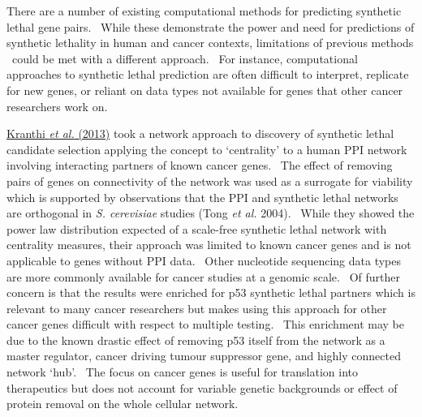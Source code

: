 There are a number of existing computational methods for predicting synthetic lethal gene pairs. \ While these demonstrate the power and need for predictions of synthetic lethality in human and cancer contexts, limitations of previous methods \ could be met with a different approach. \ For instance, computational approaches to synthetic lethal prediction are often difficult to interpret, replicate for new genes, or reliant on data types not available for genes that other cancer researchers work on. \  

\hyperlink{ENREF59}{Kranthi}\hyperlink{ENREF59}{\textit{ et al.}}\hyperlink{ENREF59}{ (2013)} took a network approach to discovery of synthetic lethal candidate selection applying the concept to {\textquoteleft}centrality{\textquoteright} to a human PPI network involving interacting partners of known cancer genes. \ The effect of removing pairs of genes on connectivity of the network was used as a surrogate for viability which is supported by observations that the PPI and synthetic lethal networks are orthogonal in \textit{S. cerevisiae} studies (Tong\textit{ et al.} 2004). \ While they showed the power law distribution expected of a scale-free synthetic lethal network with centrality measures, their approach was limited to known cancer genes and is not applicable to genes without PPI data. \ Other nucleotide sequencing data types are more commonly available for cancer studies at a genomic scale. \ Of further concern is that the results were enriched for p53 synthetic lethal partners which is relevant to many cancer researchers but makes using this approach for other cancer genes difficult with respect to multiple testing. \ This enrichment may be due to the known drastic effect of removing p53 itself from the network as a master regulator, cancer driving tumour suppressor gene, and highly connected network {\textquoteleft}hub{\textquoteright}. \ The focus on cancer genes is useful for translation into therapeutics but does not account for variable genetic backgrounds or effect of protein removal on the whole cellular network. \  

